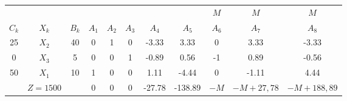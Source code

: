     \begin{tabular}{ccccccccccc}
    \hline
    \hline
            &         &         &         &         &         &         &         & $M$     & $M$     & $M$ \bigstrut[t]\\
    $C_k$   & $X_k$   & $B_k$   & $A_1$   & $A_2$   & $A_3$   & $A_4$   & $A_5$   & $A_6$   & $A_7$   & $A_8$ \bigstrut[b]\\
    \hline
    25      & $X_2$   & 40      & 0       & 1       & 0       & -3.33   & 3.33    & 0       & 3.33    & -3.33 \bigstrut[t]\\
    0       & $X_3$   & 5       & 0       & 0       & 1       & -0.89   & 0.56    & -1      & 0.89    & -0.56 \\
    50      & $X_1$   & 10      & 1       & 0       & 0       & 1.11    & -4.44   & 0       & -1.11   & 4.44 \bigstrut[b]\\
    \hline
            & $Z=1500$ &         & 0       & 0       & 0       & -27.78  & -138.89 & $-M$    & $-M+27,78$ & $-M+188,89$ \bigstrut\\
    \hline
    \hline
    \end{tabular}%
